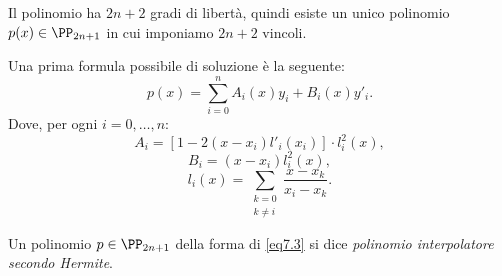 Il polinomio ha $2n +2$ gradi di libertà, quindi esiste un unico polinomio
$p(x) \in \PP_{2n+1}$ in cui imponiamo $2n+2$ vincoli.

Una prima formula possibile di soluzione è la seguente:
\begin{equation}\label{eq7.3}
p(x) = \sum_{i=0}^nA_i(x)y_i + B_i(x)y'_i.
\end{equation}
Dove, per ogni $i = 0, \ldots, n$:
\[A_i = [1-2(x-x_i)l'_i(x_i)]\cdot l_i^2(x),\]
\[B_i = (x-x_i)l_i^2(x),\]
\[l_i(x) = \sum_{\substack{k=0 \\ k\neq i}}\frac{x-x_k}{x_i-x_k}.\]

\begin{defi}
Un polinomio $p \in \PP_{2n+1}$ della forma di \ref{eq7.3} si dice
\emph{polinomio interpolatore secondo Hermite}.
\end{defi}

